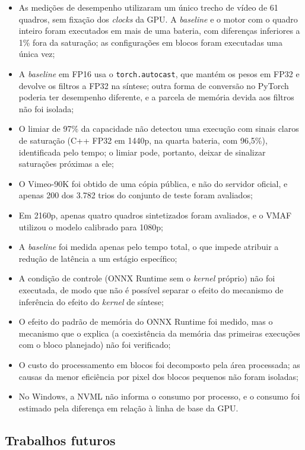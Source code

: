 \documentclass[
    12pt,                %
    openright,           %
    oneside,             %
    a4paper,             %
    english,             %
    brazil               %
]{abntex2}
\begin{document}
\begin{itemize}
    \item As medições de desempenho utilizaram um único trecho de vídeo de 61 quadros, sem fixação dos \textit{clocks} da GPU. A \textit{baseline} e o motor com o quadro inteiro foram executados em mais de uma bateria, com diferenças inferiores a 1\% fora da saturação; as configurações em blocos foram executadas uma única vez;
    \item A \textit{baseline} em FP16 usa o \texttt{torch.autocast}, que mantém os pesos em FP32 e devolve os filtros a FP32 na síntese; outra forma de conversão no PyTorch poderia ter desempenho diferente, e a parcela de memória devida aos filtros não foi isolada;
    \item O limiar de 97\% da capacidade não detectou uma execução com sinais claros de saturação (C++ FP32 em 1440p, na quarta bateria, com 96,5\%), identificada pelo tempo; o limiar pode, portanto, deixar de sinalizar saturações próximas a ele;
    \item O Vimeo-90K foi obtido de uma cópia pública, e não do servidor oficial, e apenas 200 dos 3.782 trios do conjunto de teste foram avaliados;
    \item Em 2160p, apenas quatro quadros sintetizados foram avaliados, e o VMAF utilizou o modelo calibrado para 1080p;
    \item A \textit{baseline} foi medida apenas pelo tempo total, o que impede atribuir a redução de latência a um estágio específico;
    \item A condição de controle (ONNX Runtime sem o \textit{kernel} próprio) não foi executada, de modo que não é possível separar o efeito do mecanismo de inferência do efeito do \textit{kernel} de síntese;
    \item O efeito do padrão de memória do ONNX Runtime foi medido, mas o mecanismo que o explica (a coexistência da memória das primeiras execuções com o bloco planejado) não foi verificado;
    \item O custo do processamento em blocos foi decomposto pela área processada; as causas da menor eficiência por pixel dos blocos pequenos não foram isoladas;
    \item No Windows, a NVML não informa o consumo por processo, e o consumo foi estimado pela diferença em relação à linha de base da GPU.
\end{itemize}

\subsection{Trabalhos futuros}
\label{sec:trabalhos_futuros}
\end{document}
